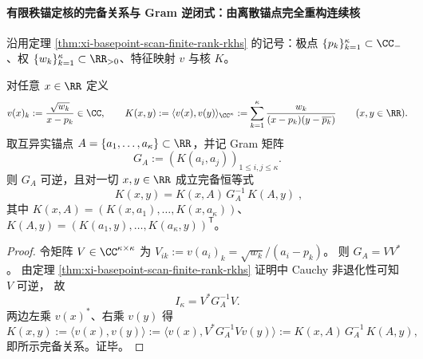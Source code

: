 
\paragraph{有限秩锚定核的完备关系与 Gram 逆闭式：由离散锚点完全重构连续核}
沿用定理 \ref{thm:xi-basepoint-scan-finite-rank-rkhs} 的记号：极点 \(\{p_k\}_{k=1}^{\kappa}\subset\CC_{-}\)、权 \(\{w_k\}_{k=1}^{\kappa}\subset\RR_{>0}\)、特征映射 \(v\) 与核 \(K\)。

\begin{proposition}\label{prop:xi-basepoint-scan-kernel-completeness-full-rank}
对任意 \(x\in\RR\) 定义
\[
v(x)_k:=\frac{\sqrt{w_k}}{x-p_k}\in\CC,\qquad
K(x,y):=\langle v(x),v(y)\rangle_{\CC^\kappa}
:=\sum_{k=1}^{\kappa}\frac{w_k}{(x-p_k)(y-\overline{p_k})}\qquad(x,y\in\RR).
\]
取互异实锚点 \(A=\{a_1,\dots,a_\kappa\}\subset\RR\)，并记 Gram 矩阵
\[
G_A:=(K(a_i,a_j))_{1\le i,j\le \kappa}.
\]
则 \(G_A\) 可逆，且对一切 \(x,y\in\RR\) 成立完备恒等式
\[
\boxed{\;
K(x,y)=K(x,A)\,G_A^{-1}\,K(A,y)\; },
\]
其中
\(
K(x,A)=(K(x,a_1),\dots,K(x,a_\kappa))
\)、
\(
K(A,y)=(K(a_1,y),\dots,K(a_\kappa,y))^{\mathsf T}
\)。
\end{proposition}
\begin{proof}
令矩阵 \(V\in\CC^{\kappa\times\kappa}\) 为
\(
V_{ik}:=v(a_i)_k=\sqrt{w_k}/(a_i-p_k)
\)。
则 \(G_A=VV^\ast\)。
由定理 \ref{thm:xi-basepoint-scan-finite-rank-rkhs} 证明中 Cauchy 非退化性可知 \(V\) 可逆，
故
\[
I_\kappa=V^\ast G_A^{-1}V.
\]
两边左乘 \(v(x)^\ast\)、右乘 \(v(y)\) 得
\[
K(x,y)
:=\langle v(x),v(y)\rangle
:=\langle v(x),V^\ast G_A^{-1}Vv(y)\rangle
:=K(x,A)\,G_A^{-1}\,K(A,y),
\]
即所示完备关系。证毕。
\end{proof}

